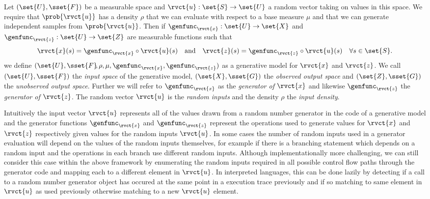 \begin{definition}\label{def:generative-model}
Let $(\set{U},\sset{F})$ be a measurable space and $\rvct{u}: \set{S} \to \set{U}$ a random vector taking on values in this space. We require that $\prob{\rvct{u}}$ has a density $\rho$ that we can evaluate with respect to a base measure $\mu$ and that we can generate independent samples from $\prob{\rvct{u}}$. Then if $\genfunc_{\rvct{x}} : \set{U} \to \set{X}$ and $\genfunc_{\rvct{z}} : \set{U} \to \set{Z}$ are measurable functions such that
\begin{equation}
  \rvct{x}(s) = \genfunc_{\rvct{x}}\circ\rvct{u}(s)
  \quad\textrm{and}\quad
  \rvct{z}(s) = \genfunc_{\rvct{z}}\circ\rvct{u}(s)
  \quad \forall s \in \set{S}.
\end{equation}
we define $(\set{U},\sset{F}\kern-2pt,\rho,\mu,\genfunc_{\rvct{x}},\genfunc_{\rvct{z}})$ as a generative model for $\rvct{x}$ and $\rvct{z}$. We call $(\set{U},\sset{F})$ the \emph{input space} of the generative model, $(\set{X},\sset{G})$ the \emph{observed output space} and $(\set{Z},\sset{G})$ the \emph{unobserved output space}. Further we will refer to $\genfunc_{\rvct{x}}$ as the \emph{generator of $\rvct{x}$} and likewise $\genfunc_{\rvct{z}}$ the \emph{generator of $\rvct{z}$}. The random vector $\rvct{u}$ is the \emph{random inputs} and the density $\rho$ the \emph{input density}.
\end{definition}

Intuitively the input vector $\rvct{u}$ represents all of the values drawn from a random number generator in the code of a generative model and the generator functions $\genfunc_{\rvct{x}}$ and $\genfunc_{\rvct{z}}$ represent the operations used to generate values for $\rvct{x}$ and $\rvct{z}$ respectively given values for the random inputs $\rvct{u}$. In some cases the number of random inputs used in a generator evaluation will depend on the values of the random inputs themselves, for example if there is a branching statement which depends on a random input and the operations in each branch use different random inputs. Although implementationally more challenging, we can still consider this case within the above framework by enumerating the random inputs required in all possible control flow paths through the generator code and mapping each to a different element in $\rvct{u}$. In interpreted languages, this can be done lazily by detecting if a call to a random number generator object  has occured at the same point in a execution trace previously and if so matching to same element in $\rvct{u}$ as used previously otherwise matching to a new $\rvct{u}$ element.%


